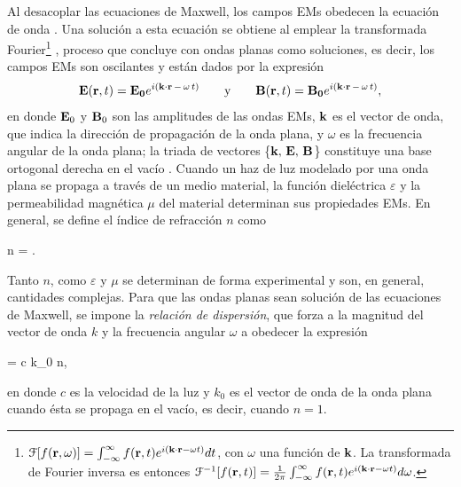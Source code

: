 Al desacoplar las ecuaciones de Maxwell, los campos EMs obedecen la ecuación de onda \cite{hecht1998optics}.  Una solución a esta ecuación se obtiene al emplear la transformada Fourier\footnote{  $\mathcal{F}[f(\vb{r},\omega)] = \int_{-\infty}^\infty f(\vb{r},t) e^{i(\vb{k}\cdot\vb{r} -\omega t)} dt$, con $\omega$ una función de $\vb{k}$. La transformada de Fourier inversa es entonces $\mathcal{F}^{-1}[f(\vb{r},t)] =\frac{1}{2\pi} \int_{-\infty}^\infty f(\vb{r},t) e^{i(\vb{k}\cdot\vb{r} -\omega t)} d\omega$.} \cite{jackson1999electrodynamics}, proceso que concluye con ondas planas como soluciones, es decir, los campos EMs son oscilantes y están dados por la expresión 
	\begin{align}
	\vb{E}(\vb{r},t) =\vb{E_0}e^{i(\vb{k}\cdot\vb{r} \,-\,\omega \,t)}
		\qquad\mbox{y}\qquad
	\vb{B}(\vb{r}, t) =\vb{B_0}e^{i(\vb{k}\cdot\vb{r} \,-\,\omega\, t)},
	\label{eq:OndaPlana}
	\end{align}		
en donde  $\vb{E}_0$ y $\vb{B}_0$ son las amplitudes de las ondas EMs, $\vb{k}$ es el vector de onda, que indica la dirección de propagación de la onda plana, y $\omega$ es la frecuencia angular de la onda plana; la triada de vectores \{$\vb{k},\, \vb{E},\, \vb{B}$\} constituye una base ortogonal derecha en el vacío \cite{griffiths2013electrodynamics}. Cuando un haz de luz modelado por una onda plana se propaga a través de un medio material, la función dieléctrica $\varepsilon$ y la permeabilidad magnética $\mu$ del material determinan sus propiedades EMs. En general, se define el índice de refracción $n$ como 	      \vspace*{-.5em}
	\begin{tcolorbox}[title = Índice de refracción, ams align]
	n = .
		\label{eq:indice} 
	\end{tcolorbox}\vspace*{-.5em}\noindent
Tanto $n$, como $\varepsilon$ y $\mu$ se determinan de forma experimental y son, en general, cantidades complejas. Para que las ondas planas sean solución de las ecuaciones de Maxwell, se impone la \emph{relación de dispersión}, que forza a  la magnitud del vector de onda $k$ y la frecuencia angular $\omega$ a obedecer la expresión \vspace*{-.5em}
	\begin{tcolorbox}[title = Relación de dispersión de una onda plana, ams align]
	\omega =  c k_0 n,
	\label{eq:dispersion}
	\end{tcolorbox}\vspace*{-1em}\noindent
en donde  $c$ es la velocidad de la luz y $k_0$ es el vector de onda de la onda plana cuando ésta se propaga en el vacío, es decir, cuando $n=1$. 



